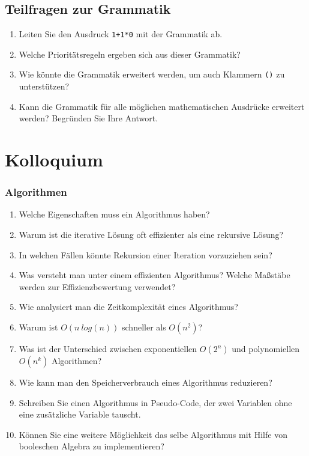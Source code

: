 \documentclass[a4paper,12pt]{article}
\begin{document}
	\subsection*{Teilfragen zur Grammatik}
	\begin{enumerate}
		\item Leiten Sie den Ausdruck \texttt{1+1*0} mit der Grammatik ab.
		\item Welche Prioritätsregeln ergeben sich aus dieser Grammatik?
		\item Wie könnte die Grammatik erweitert werden, um auch Klammern \texttt{()} zu unterstützen?
		\item Kann die Grammatik für alle möglichen mathematischen Ausdrücke erweitert werden? Begründen Sie Ihre Antwort.
\end{enumerate}
	
		\vspace{1cm}
	
	\section*{Kolloquium}
	\subsubsection*{Algorithmen}
	\begin{enumerate}
		\item Welche Eigenschaften muss ein Algorithmus haben?
		\item Warum ist die iterative Lösung oft effizienter als eine rekursive Lösung?
		\item In welchen Fällen könnte Rekursion einer Iteration vorzuziehen sein?
		\item Was versteht man unter einem effizienten Algorithmus? Welche Maßstäbe werden zur Effizienzbewertung verwendet?
		\item Wie analysiert man die Zeitkomplexität eines Algorithmus?
		\item Warum ist $O(n \ log(n))$ schneller als $O(n^2)$?
		\item Was ist der Unterschied zwischen exponentiellen $O(2^n)$ und polynomiellen $O(n^k)$ Algorithmen?
		\item Wie kann man den Speicherverbrauch eines Algorithmus reduzieren?
		\item Schreiben Sie einen Algorithmus in Pseudo-Code, der zwei Variablen ohne eine zusätzliche Variable tauscht.
		\item Können Sie eine weitere Möglichkeit das selbe Algorithmus mit Hilfe von booleschen Algebra zu implementieren?	
		
		
	\end{enumerate}
\end{document}
